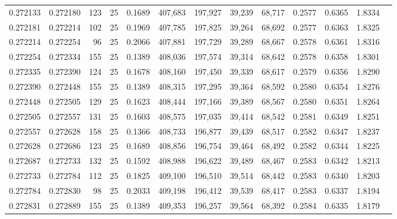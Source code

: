 \begin{tabular}{rrrrrrrrrrrrr}
0.272133 & 0.272180 &   123 &  25 &                                     0.1689 & 407,683 & 197,927 &  39,239 &  68,717 & 0.2577 & 0.6365 & 1.8334 \\
0.272181 & 0.272214 &   102 &  25 &                                     0.1969 & 407,785 & 197,825 &  39,264 &  68,692 & 0.2577 & 0.6363 & 1.8325 \\
0.272214 & 0.272254 &    96 &  25 &                                     0.2066 & 407,881 & 197,729 &  39,289 &  68,667 & 0.2578 & 0.6361 & 1.8316 \\
0.272254 & 0.272334 &   155 &  25 &                                     0.1389 & 408,036 & 197,574 &  39,314 &  68,642 & 0.2578 & 0.6358 & 1.8301 \\
0.272335 & 0.272390 &   124 &  25 &                                     0.1678 & 408,160 & 197,450 &  39,339 &  68,617 & 0.2579 & 0.6356 & 1.8290 \\
0.272390 & 0.272448 &   155 &  25 &                                     0.1389 & 408,315 & 197,295 &  39,364 &  68,592 & 0.2580 & 0.6354 & 1.8276 \\
0.272448 & 0.272505 &   129 &  25 &                                     0.1623 & 408,444 & 197,166 &  39,389 &  68,567 & 0.2580 & 0.6351 & 1.8264 \\
0.272505 & 0.272557 &   131 &  25 &                                     0.1603 & 408,575 & 197,035 &  39,414 &  68,542 & 0.2581 & 0.6349 & 1.8251 \\
0.272557 & 0.272628 &   158 &  25 &                                     0.1366 & 408,733 & 196,877 &  39,439 &  68,517 & 0.2582 & 0.6347 & 1.8237 \\
0.272628 & 0.272686 &   123 &  25 &                                     0.1689 & 408,856 & 196,754 &  39,464 &  68,492 & 0.2582 & 0.6344 & 1.8225 \\
0.272687 & 0.272733 &   132 &  25 &                                     0.1592 & 408,988 & 196,622 &  39,489 &  68,467 & 0.2583 & 0.6342 & 1.8213 \\
0.272733 & 0.272784 &   112 &  25 &                                     0.1825 & 409,100 & 196,510 &  39,514 &  68,442 & 0.2583 & 0.6340 & 1.8203 \\
0.272784 & 0.272830 &    98 &  25 &                                     0.2033 & 409,198 & 196,412 &  39,539 &  68,417 & 0.2583 & 0.6337 & 1.8194 \\
0.272831 & 0.272889 &   155 &  25 &                                     0.1389 & 409,353 & 196,257 &  39,564 &  68,392 & 0.2584 & 0.6335 & 1.8179 \\

\end{tabular}
